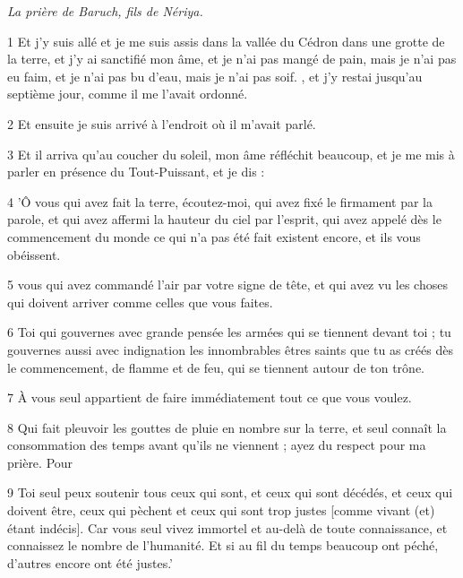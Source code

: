 \par \textit{La prière de Baruch, fils de Nériya.}

\par 1 Et j'y suis allé et je me suis assis dans la vallée du Cédron dans une grotte de la terre, et j'y ai sanctifié mon âme, et je n'ai pas mangé de pain, mais je n'ai pas eu faim, et je n'ai pas bu d'eau, mais je n'ai pas soif. , et j'y restai jusqu'au septième jour, comme il me l'avait ordonné.

\par 2 Et ensuite je suis arrivé à l'endroit où il m'avait parlé.

\par 3 Et il arriva qu'au coucher du soleil, mon âme réfléchit beaucoup, et je me mis à parler en présence du Tout-Puissant, et je dis :

\par 4 'Ô vous qui avez fait la terre, écoutez-moi, qui avez fixé le firmament par la parole, et qui avez affermi la hauteur du ciel par l'esprit, qui avez appelé dès le commencement du monde ce qui n'a pas été fait existent encore, et ils vous obéissent.

\par 5 vous qui avez commandé l'air par votre signe de tête, et qui avez vu les choses qui doivent arriver comme celles que vous faites.

\par 6 Toi qui gouvernes avec grande pensée les armées qui se tiennent devant toi ; tu gouvernes aussi avec indignation les innombrables êtres saints que tu as créés dès le commencement, de flamme et de feu, qui se tiennent autour de ton trône.

\par 7 À vous seul appartient de faire immédiatement tout ce que vous voulez.

\par 8 Qui fait pleuvoir les gouttes de pluie en nombre sur la terre, et seul connaît la consommation des temps avant qu'ils ne viennent ; ayez du respect pour ma prière. Pour

\par 9 Toi seul peux soutenir tous ceux qui sont, et ceux qui sont décédés, et ceux qui doivent être, ceux qui pèchent et ceux qui sont trop justes [comme vivant (et) étant indécis]. Car vous seul vivez immortel et au-delà de toute connaissance, et connaissez le nombre de l'humanité. Et si au fil du temps beaucoup ont péché, d'autres encore ont été justes.'

